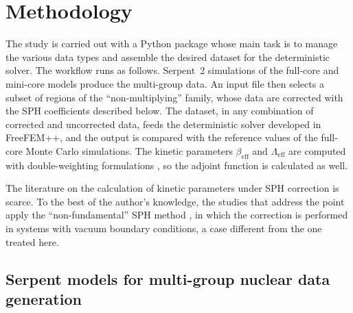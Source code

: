 \section{Methodology}

The study is carried out with a Python package whose main task is to manage the various data types and assemble the desired dataset for the deterministic solver. The workflow runs as follows. Serpent~2 simulations of the full-core and mini-core models produce the multi-group data. An input file then selects a subset of regions of the ``non-multiplying'' family, whose data are corrected with the SPH coefficients described below. The dataset, in any combination of corrected and uncorrected data, feeds the deterministic solver developed in FreeFEM++, and the output is compared with the reference values of the full-core Monte Carlo simulations. The kinetic parameters $\beta_{\mathrm{eff}}$ and $\Lambda_{\mathrm{eff}}$ are computed with double-weighting formulations \cite{SPH_book_Bell_Glasstone}, so the adjoint function is calculated as well.

The literature on the calculation of kinetic parameters under SPH correction is scarce. To the best of the author's knowledge, the studies that address the point apply the ``non-fundamental'' SPH method \cite{takasugi_2023_SPH_kinetic_parameters,INL_report_SPH_muller,Ortensi2021}, in which the correction is performed in systems with vacuum boundary conditions, a case different from the one treated here.

\subsection{Serpent models for multi-group nuclear data generation}

